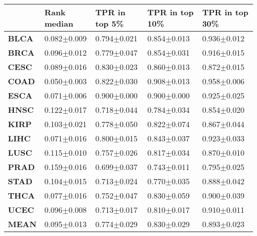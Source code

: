 \begin{tabular}{lllll}
\toprule
{} &      Rank median &   TPR in top 5\% &  TPR in top 10\% &  TPR in top 30\% \\
\midrule
\textbf{BLCA} &  0.082$\pm$0.009 &  0.794$\pm$0.021 &  0.854$\pm$0.013 &  0.936$\pm$0.012 \\
\textbf{BRCA} &  0.096$\pm$0.012 &  0.779$\pm$0.047 &  0.854$\pm$0.031 &  0.916$\pm$0.015 \\
\textbf{CESC} &  0.089$\pm$0.016 &  0.830$\pm$0.023 &  0.860$\pm$0.013 &  0.872$\pm$0.015 \\
\textbf{COAD} &  0.050$\pm$0.003 &  0.822$\pm$0.030 &  0.908$\pm$0.013 &  0.958$\pm$0.006 \\
\textbf{ESCA} &  0.071$\pm$0.006 &  0.900$\pm$0.000 &  0.900$\pm$0.000 &  0.925$\pm$0.025 \\
\textbf{HNSC} &  0.122$\pm$0.017 &  0.718$\pm$0.044 &  0.784$\pm$0.034 &  0.854$\pm$0.020 \\
\textbf{KIRP} &  0.103$\pm$0.021 &  0.778$\pm$0.050 &  0.822$\pm$0.074 &  0.867$\pm$0.044 \\
\textbf{LIHC} &  0.071$\pm$0.016 &  0.800$\pm$0.015 &  0.843$\pm$0.037 &  0.923$\pm$0.033 \\
\textbf{LUSC} &  0.115$\pm$0.010 &  0.757$\pm$0.026 &  0.817$\pm$0.034 &  0.870$\pm$0.010 \\
\textbf{PRAD} &  0.159$\pm$0.016 &  0.699$\pm$0.037 &  0.743$\pm$0.011 &  0.795$\pm$0.025 \\
\textbf{STAD} &  0.104$\pm$0.015 &  0.713$\pm$0.024 &  0.770$\pm$0.035 &  0.888$\pm$0.042 \\
\textbf{THCA} &  0.077$\pm$0.016 &  0.752$\pm$0.047 &  0.830$\pm$0.059 &  0.900$\pm$0.039 \\
\textbf{UCEC} &  0.096$\pm$0.008 &  0.713$\pm$0.017 &  0.810$\pm$0.017 &  0.910$\pm$0.011 \\
\textbf{MEAN} &  0.095$\pm$0.013 &  0.774$\pm$0.029 &  0.830$\pm$0.029 &  0.893$\pm$0.023 \\
\bottomrule
\end{tabular}
